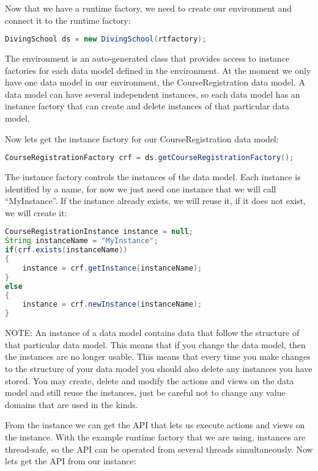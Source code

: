 Now that we have a runtime factory, we need to create our environment
and connect it to the runtime factory:

\begin{lstlisting}[basicstyle={\scriptsize},language=Java,tabsize=2]
DivingSchool ds = new DivingSchool(rtfactory);
\end{lstlisting}


The environment is an auto-generated class that provides access to
instance factories for each data model defined in the environment.
At the moment we only have one data model in our environment, the
CourseRegistration data model. A data model can have several independent
instances, so each data model has an instance factory that can create
and delete instances of that particular data model.

Now lets get the instance factory for our CourseRegistration data
model:

\begin{lstlisting}[basicstyle={\scriptsize},language=Java,tabsize=2]
CourseRegistrationFactory crf = ds.getCourseRegistrationFactory();
\end{lstlisting}


The instance factory controls the instances of the data model. Each
instance is identified by a name, for now we just need one instance
that we will call ``MyInstance''. If the instance already exists,
we will reuse it, if it does not exist, we will create it:

\begin{lstlisting}[basicstyle={\scriptsize},language=Java,tabsize=2]
CourseRegistrationInstance instance = null;
String instanceName = "MyInstance";
if(crf.exists(instanceName))
{
	instance = crf.getInstance(instanceName);
}
else
{
	instance = crf.newInstance(instanceName);
}
\end{lstlisting}


NOTE: An instance of a data model contains data that follow the structure
of that particular data model. This means that if you change the data
model, then the instances are no longer usable. This means that every
time you make changes to the structure of your data model you should
also delete any instances you have stored. You may create, delete
and modify the actions and views on the data model and still reuse
the instances, just be careful not to change any value domains that
are used in the kinds.

From the instance we can get the API that lets us execute actions
and views on the instance. With the example runtime factory that we
are using, instances are thread-safe, so the API can be operated from
several threads simultaneously. Now lets get the API from our instance:

